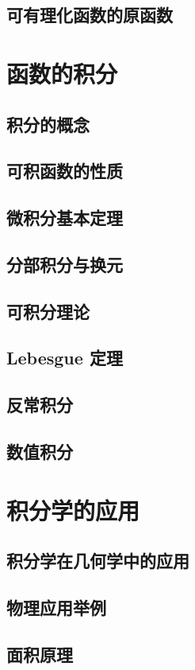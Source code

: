 \documentclass[a4paper, 11pt]{ctexbook}
\begin{document}
        \section{可有理化函数的原函数}
    \chapter{函数的积分}
        \section{积分的概念}
        \section{可积函数的性质}
        \section{微积分基本定理}
        \section{分部积分与换元}
        \section{可积分理论}
        \section{Lebesgue 定理}
        \section{反常积分}
        \section{数值积分}
    \chapter{积分学的应用}
        \section{积分学在几何学中的应用}
        \section{物理应用举例}
        \section{面积原理}
\end{document}
